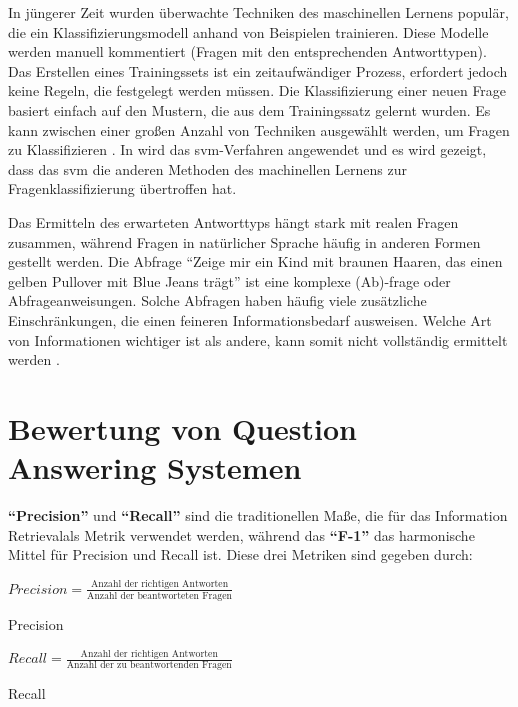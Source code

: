 \documentclass[
        ngerman,
        paper=a4,
        numbers=noendperiod,
]{scrreprt}
\begin{document}
In jüngerer Zeit wurden überwachte Techniken des maschinellen Lernens populär, die ein Klassifizierungsmodell anhand von Beispielen trainieren. Diese Modelle werden manuell kommentiert (Fragen mit den entsprechenden Antworttypen). Das Erstellen eines Trainingssets ist ein zeitaufwändiger Prozess, erfordert jedoch keine Regeln, die festgelegt werden müssen. Die Klassifizierung einer neuen Frage basiert einfach auf den Mustern, die aus dem Trainingssatz gelernt wurden. Es kann zwischen einer großen Anzahl von Techniken ausgewählt werden, um Fragen zu Klassifizieren \citep[S. 5421]{Kolomiyets2011APerspective}. In \citep{zhang2003question} wird das \ac{svm}-Verfahren angewendet und es wird gezeigt, dass das \ac{svm} die anderen Methoden des machinellen Lernens zur Fragenklassifizierung übertroffen hat.

Das Ermitteln des erwarteten Antworttyps hängt stark mit realen Fragen zusammen, während Fragen in natürlicher Sprache häufig in anderen Formen gestellt werden. Die Abfrage \enquote{Zeige mir ein Kind mit braunen Haaren, das einen gelben Pullover mit Blue Jeans trägt} ist eine komplexe (Ab)-frage oder Abfrageanweisungen. Solche Abfragen   haben häufig viele zusätzliche Einschränkungen, die einen feineren Informationsbedarf ausweisen. Welche Art von Informationen wichtiger ist als andere, kann somit nicht vollständig ermittelt werden \citep[S. 5422]{Kolomiyets2011APerspective}. 


\section{Bewertung von Question Answering Systemen}
\textbf{\enquote{Precision}} und \textbf{\enquote{Recall}} sind die traditionellen Maße, die für das Information Retrievalals Metrik verwendet werden, während das \textbf{\enquote{F-1}} das harmonische Mittel für Precision und Recall ist. Diese drei Metriken sind gegeben durch:

\begin{xequation-} 
\centering ${Precision}= \frac{\text{Anzahl der richtigen Antworten}}{\text{Anzahl der beantworteten Fragen}}$
\caption[Precision]{Precision} 
    \label{eqn:PRE}
\end{xequation-} 

\begin{xequation-} 
\centering ${Recall}= \frac{\text{Anzahl der richtigen Antworten}}{\text{Anzahl der zu beantwortenden Fragen}}$
\caption[Recall]{Recall} 
    \label{eqn:REC}
\end{xequation-} 
\end{document}
